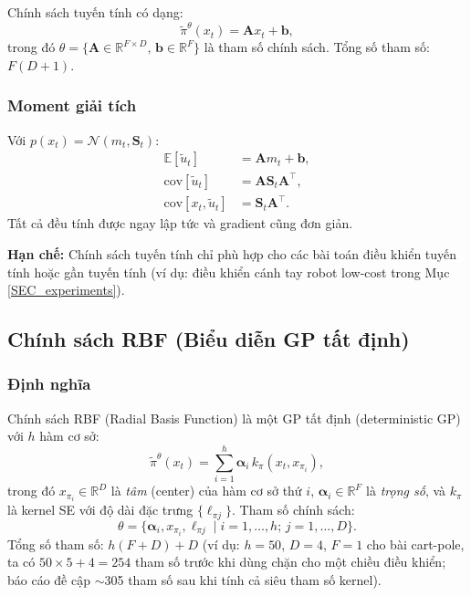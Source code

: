 Chính sách tuyến tính có dạng:
\begin{equation}
    \tilde{\pi}^\theta(x_t) = \mathbf{A} x_t + \mathbf{b},
    \label{linear_policy}
\end{equation}
trong đó $\theta = \{\mathbf{A} \in \mathbb{R}^{F \times D},\, \mathbf{b} \in \mathbb{R}^F\}$ là tham số chính sách. Tổng số tham số: $F(D+1)$.

\subsubsection{Moment giải tích}
\label{SUB_SUB_SEC_linear_moments}

Với $p(x_t) = \mathcal{N}(m_t, \mathbf{S}_t)$:
\begin{align}
    \mathbb{E}[\tilde{u}_t] &= \mathbf{A} m_t + \mathbf{b},
    \label{linear_mean} \\
    \mathrm{cov}[\tilde{u}_t] &= \mathbf{A} \mathbf{S}_t \mathbf{A}^\top,
    \label{linear_cov} \\
    \mathrm{cov}[x_t, \tilde{u}_t] &= \mathbf{S}_t \mathbf{A}^\top.
    \label{linear_cross_cov}
\end{align}
Tất cả đều tính được ngay lập tức và gradient cũng đơn giản.

\textbf{Hạn chế:} Chính sách tuyến tính chỉ phù hợp cho các bài toán điều khiển tuyến tính hoặc gần tuyến tính (ví dụ: điều khiển cánh tay robot low-cost trong Mục \ref{SEC_experiments}).

\subsection{Chính sách RBF (Biểu diễn GP tất định)}
\label{SUB_SEC_rbf_policy}

\subsubsection{Định nghĩa}
\label{SUB_SUB_SEC_rbf_def}

Chính sách RBF (Radial Basis Function) là một GP tất định (deterministic GP) với $h$ hàm cơ sở:
\begin{equation}
    \tilde{\pi}^\theta(x_t) = \sum_{i=1}^{h} \boldsymbol{\alpha}_i\, k_\pi(x_t, x_{\pi_i}),
    \label{rbf_policy}
\end{equation}
trong đó $x_{\pi_i} \in \mathbb{R}^D$ là \textit{tâm} (center) của hàm cơ sở thứ $i$, $\boldsymbol{\alpha}_i \in \mathbb{R}^F$ là \textit{trọng số}, và $k_\pi$ là kernel SE với độ dài đặc trưng $\{\ell_{\pi j}\}$. Tham số chính sách:
\begin{equation}
    \theta = \{\boldsymbol{\alpha}_i, x_{\pi_i}, \ell_{\pi j} \mid i = 1,\dots,h;\, j = 1,\dots,D\}.
    \label{rbf_params}
\end{equation}
Tổng số tham số: $h(F + D) + D$ (ví dụ: $h = 50$, $D = 4$, $F = 1$ cho bài cart-pole, ta có $50 \times 5 + 4 = 254$ tham số trước khi dùng chặn cho một chiều điều khiển; báo cáo đề cập $\sim$305 tham số sau khi tính cả siêu tham số kernel).

